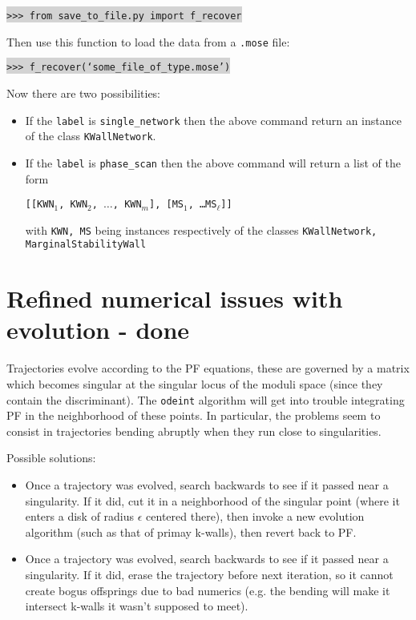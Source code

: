 \documentclass[11pt]{report}
\begin{document}
\smallskip

\indent \colorbox{lightgray}{\tt>>> from save\_to\_file.py import f\_recover}

\smallskip

\noindent Then use this function to load the data from a {\tt *.mose} file:

\smallskip

\indent \colorbox{lightgray}{\tt>>> f\_recover(`some\_file\_of\_type.mose')}

\bigskip

\noindent Now there are two possibilities: 
\begin{itemize}
	\item If the {\tt label} is {\tt single\_network} then the above command return an instance of the class {\tt KWallNetwork}.
	\item If the  {\tt label} is {\tt phase\_scan} then the above command will return a list of the form\\
	\begin{center}  {\tt [[KWN${}_{1}$, KWN${}_{2}$, $\dots$, KWN${}_{m}$], [MS${}_{1}$, \dots MS${}_{\ell}$]]}  \end{center}
	with {\tt KWN, MS} being instances respectively of the classes {\tt KWallNetwork, MarginalStabilityWall}
\end{itemize}


\section{Refined numerical issues with evolution  - {\color{red} \bf done}}
Trajectories evolve according to the PF equations, these are governed by a matrix which becomes singular at the singular locus of the moduli space (since they contain the discriminant).
The {\texttt{odeint}} algorithm will get into trouble integrating PF in the neighborhood of these points.
In particular, the problems seem to consist in trajectories bending abruptly when they run close to singularities.

\medskip

\noindent Possible solutions:
\begin{itemize}
	\item Once a trajectory was evolved, search backwards to see if it passed near a singularity. If it did, cut it in a neighborhood of the singular point (where it enters a disk of radius $\epsilon$ centered there), then invoke a new evolution algorithm (such as that of primay k-walls), then revert back to PF.
	\item Once a trajectory was evolved, search backwards to see if it passed near a singularity. If it did, erase the trajectory before next iteration, so it cannot create bogus offsprings due to bad numerics (e.g. the bending will make it intersect k-walls it wasn't supposed to meet).
\end{itemize}
\end{document}
